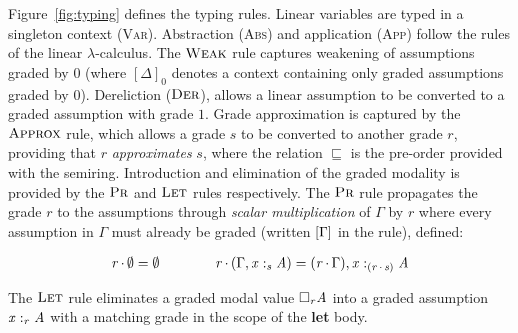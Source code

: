 Figure~\ref{fig:typing} defines the typing rules.
Linear variables are typed in a singleton context
(\textsc{Var}). Abstraction (\textsc{Abs}) and application (\textsc{App})
follow the rules of the linear $\lambda$-calculus.
The $\textsc{Weak}$ rule captures
weakening of assumptions graded by $0$ (where $[  \Delta  ]_{  0  }$ denotes a context
containing only graded assumptions graded by $0$). Dereliction ($\textsc{Der}$),
allows a linear assumption to be converted to a graded assumption with grade
$1$. Grade approximation is captured by the $\textsc{Approx}$
rule, which allows a grade $s$ to be converted to another grade $r$,
providing that $r$ \textit{approximates} $s$, where the relation
$\sqsubseteq$ is the pre-order provided
with the semiring.
Introduction and elimination of the graded modality is provided by the
$\textsc{Pr}$ and $\textsc{Let}$ rules
respectively. The $\textsc{Pr}$ rule propagates the grade $r$ to the
assumptions through \emph{scalar multiplication} of $\Gamma$ by $r$ where
every assumption in $\Gamma$ must already be graded (written $[  \Gamma  ]$ in the rule), defined:
%
%
\begin{definition}
  \label{def:scalar}
\begin{align*}
   \textcolor{coeffectColor}{ \GRANULEnt{r}   \textcolor{coeffectColor}{\,\cdot\,} }   \emptyset = \emptyset
    \qquad\qquad
    \textcolor{coeffectColor}{ \GRANULEnt{r}   \textcolor{coeffectColor}{\,\cdot\,} }  \GRANULEsym{(}  \Gamma  \GRANULEsym{,}   \GRANULEmv{x}  :_{\textcolor{coeffectColor}{  \GRANULEnt{s}  } }   \GRANULEnt{A}   \GRANULEsym{)} = \GRANULEsym{(}   \textcolor{coeffectColor}{ \GRANULEnt{r}   \textcolor{coeffectColor}{\,\cdot\,} }  \Gamma   \GRANULEsym{)}  \GRANULEsym{,}   \GRANULEmv{x}  :_{\textcolor{coeffectColor}{  \GRANULEsym{(}  \GRANULEnt{r}  \textcolor{coeffectColor}{\,\cdot\,}  \GRANULEnt{s}  \GRANULEsym{)}  } }   \GRANULEnt{A}
\end{align*}
\end{definition}

The $\textsc{Let}$ rule eliminates a graded modal value $\Box_{  \mathit{r}  }  \mathit{A}$
into a graded assumption $\GRANULEmv{x}  :_{\textcolor{coeffectColor}{  \GRANULEnt{r}  } }   \GRANULEnt{A}$ with a matching
grade in the scope of the \textbf{let} body.


